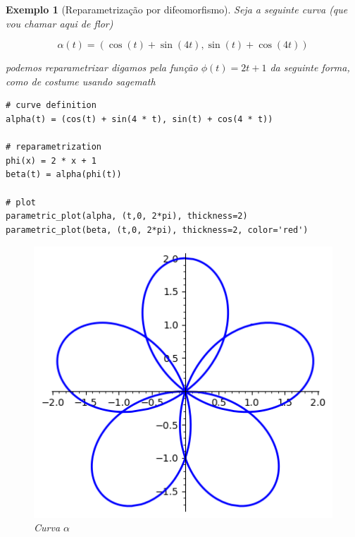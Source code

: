 \documentclass[12pt]{article}
\newtheorem{ex}{Exemplo}[section]
\begin{document}
\begin{ex}[Reparametrização por difeomorfismo]
Seja a seguinte curva (que vou chamar aqui de flor)

$$\alpha(t) = (\cos(t) + \sin(4 t), \sin(t) + \cos(4 t))$$

podemos reparametrizar digamos pela função $\phi(t) = 2 t + 1$ da seguinte forma, como de costume usando \textit{sagemath}

\begin{lstlisting}
# curve definition
alpha(t) = (cos(t) + sin(4 * t), sin(t) + cos(4 * t))

# reparametrization
phi(x) = 2 * x + 1
beta(t) = alpha(phi(t))

# plot
parametric_plot(alpha, (t,0, 2*pi), thickness=2)
parametric_plot(beta, (t,0, 2*pi), thickness=2, color='red')
\end{lstlisting}

\begin{figure}[H]
    \centering
    \includegraphics[scale=.6]{Images/ex2.1-1.png}
    \caption{Curva $\alpha$}
    \label{fig:ex2.1-1}
\end{figure}


\end{ex}
\end{document}
